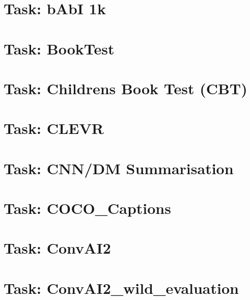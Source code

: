 \documentclass[twoside]{book}
\newcommand{\+}{\discretionary{\mbox{\scriptsize$\hookleftarrow$}}{}{}}
\begin{document}
\chapter{Task\+: b\+AbI 1k}
\label{md_parlai_tasks_babi_README}

\chapter{Task\+: Book\+Test}
\label{md_parlai_tasks_booktest_README}

\chapter{Task\+: Children\textquotesingle{}s Book Test (C\+BT)}
\label{md_parlai_tasks_cbt_README}

\chapter{Task\+: C\+L\+E\+VR}
\label{md_parlai_tasks_clevr_README}

\chapter{Task\+: C\+N\+N/\+DM Summarisation}
\label{md_parlai_tasks_cnn_dm_README}

\chapter{Task\+: C\+O\+C\+O\+\_\+\+Captions}
\label{md_parlai_tasks_coco_caption_README}

\chapter{Task\+: Conv\+A\+I2}
\label{md_parlai_tasks_convai2_README}

\chapter{Task\+: Conv\+A\+I2\+\_\+wild\+\_\+evaluation}
\label{md_parlai_tasks_convai2_wild_evaluation_README}

\end{document}
